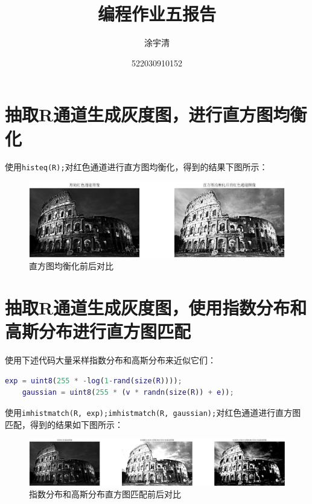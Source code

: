 \documentclass[UTF8,a4paper,11pt]{ctexart}
\title{\textbf{\Large{编程作业五报告}}}
\author{涂宇清}
\date{522030910152}
\begin{document}
 
\maketitle
\setcounter{page}{1}        %
 
 
\section{抽取R通道生成灰度图，进行直方图均衡化}
使用\verb|histeq(R);|对红色通道进行直方图均衡化，得到的结果下图所示：
\begin{figure}[H]
	\centering
	\includegraphics[width=1\textwidth]{PA5_1.jpg}
	\caption{直方图均衡化前后对比}
\end{figure}

\section{抽取R通道生成灰度图，使用指数分布和高斯分布进行直方图匹配}
使用下述代码大量采样指数分布和高斯分布来近似它们：
\begin{lstlisting}[language=matlab]
	exp = uint8(255 * -log(1-rand(size(R))));
	gaussian = uint8(255 * (v * randn(size(R)) + e));
\end{lstlisting}	

使用\verb|imhistmatch(R, exp);|\verb|imhistmatch(R, gaussian);|对红色通道进行直方图匹配，得到的结果如下图所示：
\begin{figure}[H]
	\centering
	\includegraphics[width=1\textwidth]{PA5_2.jpg}
	\caption{指数分布和高斯分布直方图匹配前后对比}
\end{figure}
\end{document}
